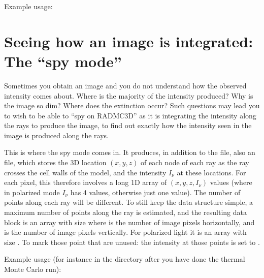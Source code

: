 \documentclass[letterpaper,10pt,english]{sphinxmanual}
\begin{document}
Example usage:

\begin{sphinxVerbatim}[commandchars=\\\{\}]
        
\end{sphinxVerbatim}


\section{Seeing how an image is integrated: The “spy mode”}
\label{\detokenize{imagesspectra:seeing-how-an-image-is-integrated-the-spy-mode}}\label{\detokenize{imagesspectra:sec-spy-image}}
Sometimes you obtain an image and you do not understand how the observed
intensity comes about. Where is the majority of the intensity produced?
Why is the image so dim? Where does the extinction occur? Such questions
may lead you to wish to be able to “spy on RADMC\sphinxhyphen{}3D” as it is integrating
the intensity along the rays to produce the image, to find out exactly
how the intensity seen in the image is produced along the rays.

This is where the spy mode comes in. It produces, in addition to the
 file, also an  file, which stores the 3D
location \((x,y,z)\) of each node of each ray as the ray crosses
the cell walls of the model, and the intensity \(I_\nu\) at these
locations. For each pixel, this therefore involves a long 1\sphinxhyphen{}D array
of \((x,y,z,I_\nu)\) values (where in polarized mode \(I_\nu\)
has 4 values, otherwise just one value). The number of points along
each ray will be different. To still keep the data structure simple,
a maximum number of points along the ray  is estimated, and the
resulting data block is an array with size \sphinxcode{\sphinxupquote{{[}maxraylen,nx,ny{]}}}
where  is the number of image pixels horizontally, and
 is the number of image pixels vertically. For polarized light
it is an array with size \sphinxcode{\sphinxupquote{{[}4,maxraylen,nx,ny{]}}}. To mark those point
that are unused: the intensity at those points is set to .

Example usage (for instance in the  directory
after you have done the thermal Monte Carlo run):
\end{document}
